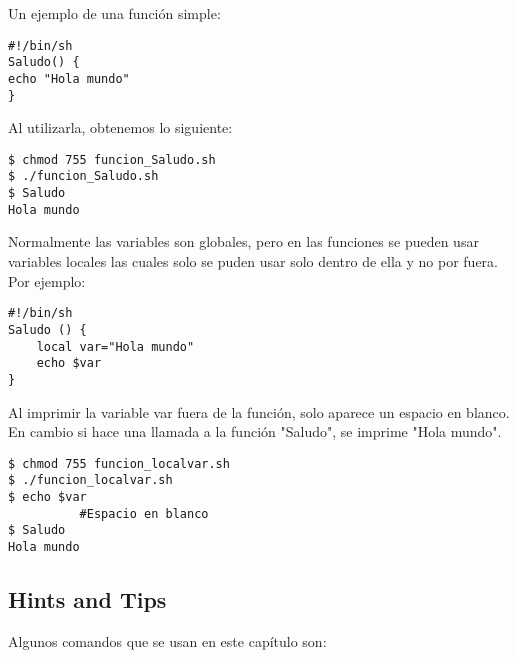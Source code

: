 \documentclass[a4paper]{article}
\begin{document}
Un ejemplo de una función simple:

\begin{verbatim}
#!/bin/sh
Saludo() {
echo "Hola mundo"
}
\end{verbatim}
Al utilizarla, obtenemos lo siguiente: 
\begin{verbatim}
$ chmod 755 funcion_Saludo.sh
$ ./funcion_Saludo.sh
$ Saludo
Hola mundo
\end{verbatim}


Normalmente las variables son globales, pero en las funciones se pueden usar variables locales las cuales solo se puden usar solo dentro de ella y no por fuera. Por ejemplo:

\begin{verbatim}
#!/bin/sh
Saludo () {
    local var="Hola mundo"
    echo $var
}

\end{verbatim}

Al imprimir la variable var fuera de la función, solo aparece un espacio en blanco. En cambio si hace una llamada a la función "Saludo", se imprime "Hola mundo".

\begin{verbatim}
$ chmod 755 funcion_localvar.sh
$ ./funcion_localvar.sh
$ echo $var
          #Espacio en blanco
$ Saludo
Hola mundo
\end{verbatim}



\subsection{Hints and Tips}
Algunos comandos que se usan en este capítulo son:
\end{document}
